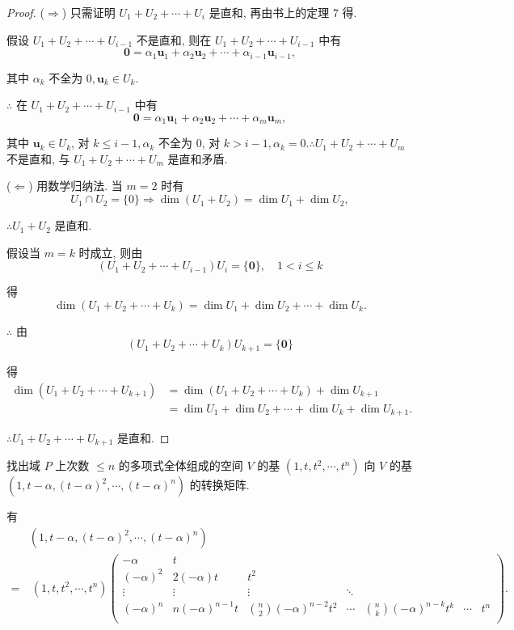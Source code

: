 \documentclass{ctexart}
\begin{document}
\begin{proof}
    ($\Rightarrow$) 只需证明 $U_1+U_2+\cdots+U_i$ 是直和, 再由书上的定理 7 得.

    假设 $U_1+U_2+\cdots+U_{i-1}$ 不是直和, 则在 $U_1+U_2+\cdots+U_{i-1}$ 中有
    \[\boldsymbol{0}=\alpha_1\boldsymbol{u}_1+\alpha_2\boldsymbol{u}_2+\cdots+\alpha_{i-1}\boldsymbol{u}_{i-1},\]

    其中 $\alpha_k$ 不全为 $0,\boldsymbol{u}_k\in U_k$.

    $\therefore$ 在 $U_1+U_2+\cdots+U_{i-1}$ 中有
    \[\boldsymbol{0}=\alpha_1\boldsymbol{u}_1+\alpha_2\boldsymbol{u}_2+\cdots+\alpha_m\boldsymbol{u}_m,\]

    其中 $\boldsymbol{u}_k\in U_k$, 对 $k\leq i-1,\alpha_k$ 不全为 $0$, 对 $k>i-1,\alpha_k=0.\therefore U_1+U_2+\cdots+U_m$ 不是直和, 与 $U_1+U_2+\cdots+U_m$ 是直和矛盾.

    ($\Leftarrow$) 用数学归纳法. 当 $m=2$ 时有
    \[U_1\cap U_2=\{0\}\Rightarrow\dim(U_1+U_2)=\dim U_1+\dim U_2,\]

    $\therefore U_1+U_2$ 是直和.

    假设当 $m=k$ 时成立, 则由
    \[(U_1+U_2+\cdots+U_{i-1})U_i=\{\boldsymbol{0}\},\quad 1<i\leq k\]

    得
    \[\dim(U_1+U_2+\cdots+U_k)=\dim U_1+\dim U_2+\cdots+\dim U_k.\]

    $\therefore$ 由
    \[(U_1+U_2+\cdots+U_k)U_{k+1}=\{\boldsymbol{0}\}\]

    得
    \begin{align*}
        \dim(U_1+U_2+\cdots+U_{k+1}) & =\dim(U_1+U_2+\cdots+U_k)+\dim U_{k+1} \\
        & =\dim U_1+\dim U_2+\cdots+\dim U_k+\dim U_{k+1}.
    \end{align*}

    $\therefore U_1+U_2+\cdots+U_{k+1}$ 是直和.
\end{proof}
\begin{exercise}%
    找出域 $P$ 上次数 $\leq n$ 的多项式全体组成的空间 $V$ 的基 $(1,t,t^2,\cdots,t^n)$ 向 $V$ 的基 $(1,t-\alpha,(t-\alpha)^2,\cdots,(t-\alpha)^n)$ 的转换矩阵.
\end{exercise}
\begin{solution}
    有
    \begin{align*}
          & (1,t-\alpha,(t-\alpha)^2,\cdots,(t-\alpha)^n) \\
        = & \ (1,t,t^2,\cdots,t^n)\begin{pmatrix}
        -\alpha     & t \\
        (-\alpha)^2 & 2(-\alpha)t       & t^2 \\
        \vdots      & \vdots            & \vdots & \ddots \\
        (-\alpha)^n & n(-\alpha)^{n-1}t & \binom{n}{2}(-\alpha)^{n-2}t^2 & \cdots & \binom{n}{k}(-\alpha)^{n-k}t^k & \cdots & t^n \\
    \end{pmatrix}.
    \end{align*}
\end{solution}
\end{document}
